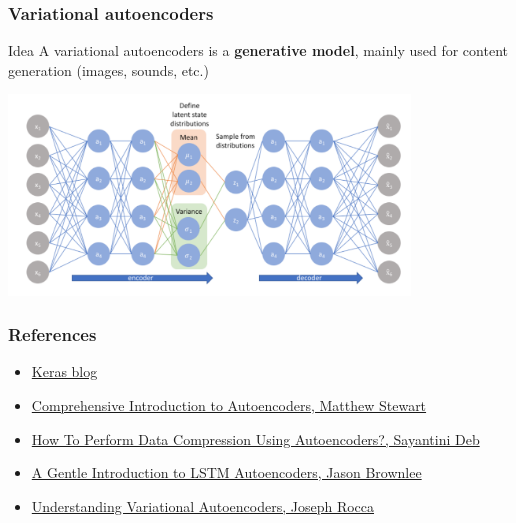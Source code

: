 \documentclass[11pt,a4paper]{beamer}
\begin{document}
\begin{frame}
	\frametitle{Variational autoencoders}

	\begin{block}{Idea}
		A variational autoencoders is a \textbf{generative model}, mainly used for content generation (images, sounds, etc.)
	\end{block}

	\centering
	\includegraphics[width=0.8\textwidth]{figures/VAE.png}

\end{frame}





\begin{frame}
	\frametitle{References}
	\begin{itemize}
		\item \href{https://blog.keras.io/building-autoencoders-in-keras.html}{Keras blog}  
		\item \href{https://towardsdatascience.com/generating-images-with-autoencoders-77fd3a8dd368}{Comprehensive Introduction to Autoencoders, Matthew Stewart}
		\item \href{https://medium.com/edureka/autoencoders-tutorial-cfdcebdefe37}{How To Perform Data Compression Using Autoencoders?, Sayantini Deb}
		\item \href{https://machinelearningmastery.com/lstm-autoencoders/}{A Gentle Introduction to LSTM Autoencoders, Jason Brownlee}
		\item \href{hhttps://towardsdatascience.com/understanding-variational-autoencoders-vaes-f70510919f73}{Understanding Variational Autoencoders, Joseph Rocca}
	\end{itemize}
\end{frame}
\end{document}
